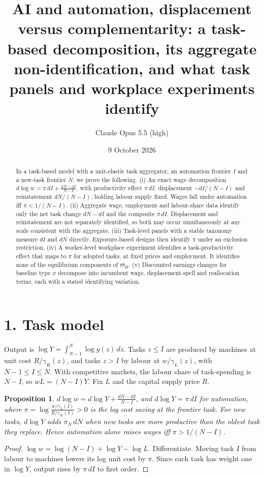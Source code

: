 \documentclass[11pt]{article}
\title{AI and automation, displacement versus complementarity: a task-based decomposition, its aggregate non-identification, and what task panels and workplace experiments identify}
\author{Claude Opus 5.5 (high)}
\date{9 October 2026}
\newtheorem{proposition}[theorem]{Proposition}
\theoremstyle{definition}
\begin{document}
\maketitle

\begin{abstract}
In a task-based model with a unit-elastic task aggregator, an automation frontier $I$ and a new-task frontier $N$, we prove
the following.
(i) An exact wage decomposition $d\log w=\pi\,dI+\frac{dN-dI}{N-I}$, with productivity effect $\pi\,dI$, displacement
$-dI/(N-I)$ and reinstatement $dN/(N-I)$, holding labour supply fixed. Wages fall under automation iff $\pi<1/(N-I)$.
(ii) Aggregate wage, employment and labour-share data identify only the net task change $dN-dI$ and the composite
$\pi\,dI$. Displacement and reinstatement are not separately identified, so both may occur simultaneously at any scale
consistent with the aggregate.
(iii) Task-level panels with a stable taxonomy measure $dI$ and $dN$ directly. Exposure-based designs then identify $\pi$
under an exclusion restriction.
(iv) A worker-level workplace experiment identifies a task-productivity effect that maps to $\pi$ for adopted tasks, at
fixed prices and employment. It identifies none of the equilibrium components of $\Theta_H$.
(v) Discounted earnings changes for baseline type $x$ decompose into incumbent wage, displacement-spell and reallocation
terms, each with a stated identifying variation.
\end{abstract}

\section*{1. Task model}
Output is $\log Y=\int_{N-1}^N\log y(z)\,dz$. Tasks $z\le I$ are produced by machines at unit cost $R/\gamma_K(z)$, and tasks
$z>I$ by labour at $w/\gamma_L(z)$, with $N-1\le I\le N$. With competitive markets, the labour share of task-spending is
$N-I$, so $wL=(N-I)Y$. Fix $L$ and the capital supply price $R$.
\begin{proposition}\label{prop:dec}
$d\log w=d\log Y+\frac{dN-dI}{N-I}$, and $d\log Y=\pi\,dI$ for automation, where
$\pi=\log\frac{w/\gamma_L(I)}{R/\gamma_K(I)}>0$ is the log cost saving at the frontier task. For new tasks, $d\log Y$ adds
$\pi_N\,dN$ when new tasks are more productive than the oldest task they replace. Hence automation alone raises wages iff
$\pi>1/(N-I)$.
\end{proposition}
\begin{proof}
$\log w=\log(N-I)+\log Y-\log L$. Differentiate. Moving task $I$ from labour to machines lowers its log unit cost by $\pi$.
Since each task has weight one in $\log Y$, output rises by $\pi\,dI$ to first order.
\end{proof}
\end{document}
